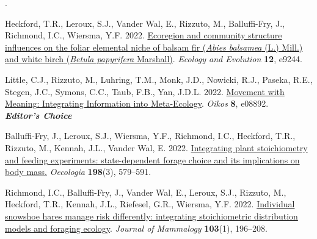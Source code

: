 

. 

\begin{etaremune}
  \renewcommand\labelenumi{\bfseries\theenumi .}
  \item Heckford, T.R., Leroux, S.J., Vander Wal, E., \textcolor{awesome}{Rizzuto, M.}, Balluffi-Fry, J., Richmond, I.C., Wiersma, Y.F. 2022. \href{https://doi.org/10.1002/ece3.9244}{Ecoregion and community structure influences on the foliar elemental niche of balsam fir (\textit{Abies balsamea} (L.) Mill.) and white birch (\textit{Betula papyrifera} Marshall)}. \emph{Ecology and Evolution} \textbf{12}, e9244. 
  \item Little, C.J.\textsuperscript{\textdagger}, \textcolor{awesome}{Rizzuto, M.}\textsuperscript{\textdagger}, Luhring, T.M., Monk, J.D., Nowicki, R.J., Paseka, R.E., Stegen, J.C., Symons, C.C., Taub, F.B., Yan, J.D.L. 2022. \href{https://doi.org/10.1111/oik.08892}{Movement with Meaning: Integrating Information into Meta-Ecology}. \emph{Oikos} \textbf{8}, e08892.\\ \null\hfill\textbf{\textit{Editor's Choice}}
  \item Balluffi-Fry, J., Leroux, S.J., Wiersma, Y.F., Richmond, I.C., Heckford, T.R., \textcolor{awesome}{Rizzuto, M.}, Kennah, J.L., Vander Wal, E. 2022. \href{https://rdcu.be/cAY5a}{Integrating plant stoichiometry and feeding experiments: state-dependent forage choice and its implications on body mass.} \emph{Oecologia} \textbf{198}(3), 579--591.
  \item Richmond, I.C., Balluffi-Fry, J., Vander Wal, E., Leroux, S.J., \textcolor{awesome}{Rizzuto, M.}, Heckford, T.R., Kennah, J.L., Riefesel, G.R., Wiersma, Y.F. 2022. \href{https://academic.oup.com/jmammal/advance-article/doi/10.1093/jmammal/gyab130/6441781?guestAccessKey=8f89e422-7fb9-4ce9-a9dc-ccf46f3dd0cc}{Individual snowshoe hares manage risk differently: integrating stoichiometric distribution models and foraging ecology}. \emph{Journal of Mammalogy} \textbf{103}(1), 196--208.

\end{etaremune}
